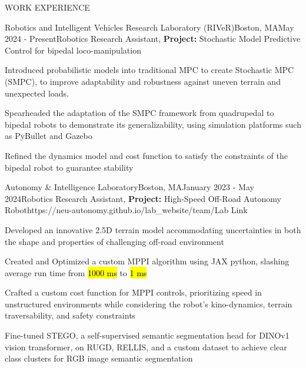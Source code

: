 \documentclass{resume} %
\begin{document}
\begin{rSection}{WORK EXPERIENCE}
	\begin{rProjExpDetails}{Robotics and Intelligent Vehicles Research Laboratory (RIVeR)}{Boston, MA}{May 2024 - Present}{Robotics Research Assistant, \textbf{Project:} Stochastic Model Predictive Control for bipedal loco-manipulation}{}{}
		\item Introduced probabilistic models into traditional MPC to create Stochastic MPC (SMPC), to improve adaptability and robustness against uneven terrain and unexpected loads.
		\item Spearheaded the adaptation of the SMPC framework from quadrupedal to bipedal robots to demonstrate its generalizability, using simulation platforms such as PyBullet and Gazebo
		\item Refined the dynamics model and cost function to satisfy the constraints of the bipedal robot to guarantee stability %
	\end{rProjExpDetails}
	\begin{rProjExpDetails}{Autonomy \& Intelligence Laboratory}{Boston, MA}{January 2023 - May 2024}{Robotics Research Assistant, \textbf{Project:} High-Speed Off-Road Autonomy Robot}{https://neu-autonomy.github.io/lab_website/team/}{Lab Link}
		\item Developed an innovative 2.5D terrain model accommodating uncertainties in both the shape and properties of challenging off-road environment
		\item Created and Optimized a custom MPPI algorithm using JAX python, slashing average run time from \hl{1000 ms} to \hl{1 ms}
		\item Crafted a custom cost function for MPPI controls, prioritizing speed in unstructured environments while considering the robot's kino-dynamics, terrain traversability, and safety constraints
		\item Fine-tuned STEGO, a self-supervised semantic segmentation head for DINOv1 vision transformer, on RUGD, RELLIS, and a custom dataset to achieve clear class clusters for RGB image semantic segmentation

\end{rProjExpDetails}
\end{rSection}
\end{document}
